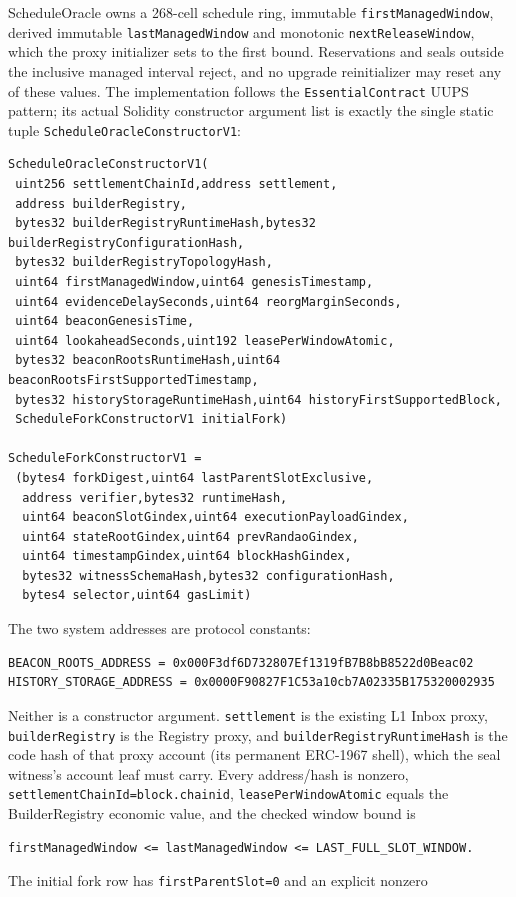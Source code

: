 \documentclass[a4paper,11pt]{article}
\newcommand{\code}[1]{\nolinkurl{#1}}
\begin{document}
ScheduleOracle owns a 268-cell schedule ring, immutable
\code{firstManagedWindow}, derived immutable \code{lastManagedWindow} and
monotonic \code{nextReleaseWindow}, which the proxy initializer sets to the
first bound.  Reservations and seals outside the inclusive managed interval
reject, and no upgrade reinitializer may reset any of these values.  The
implementation follows the \code{EssentialContract} UUPS pattern; its actual
Solidity constructor argument list is exactly the single static tuple
\code{ScheduleOracleConstructorV1}:
\begin{verbatim}
ScheduleOracleConstructorV1(
 uint256 settlementChainId,address settlement,
 address builderRegistry,
 bytes32 builderRegistryRuntimeHash,bytes32 builderRegistryConfigurationHash,
 bytes32 builderRegistryTopologyHash,
 uint64 firstManagedWindow,uint64 genesisTimestamp,
 uint64 evidenceDelaySeconds,uint64 reorgMarginSeconds,
 uint64 beaconGenesisTime,
 uint64 lookaheadSeconds,uint192 leasePerWindowAtomic,
 bytes32 beaconRootsRuntimeHash,uint64 beaconRootsFirstSupportedTimestamp,
 bytes32 historyStorageRuntimeHash,uint64 historyFirstSupportedBlock,
 ScheduleForkConstructorV1 initialFork)

ScheduleForkConstructorV1 =
 (bytes4 forkDigest,uint64 lastParentSlotExclusive,
  address verifier,bytes32 runtimeHash,
  uint64 beaconSlotGindex,uint64 executionPayloadGindex,
  uint64 stateRootGindex,uint64 prevRandaoGindex,
  uint64 timestampGindex,uint64 blockHashGindex,
  bytes32 witnessSchemaHash,bytes32 configurationHash,
  bytes4 selector,uint64 gasLimit)
\end{verbatim}
The two system addresses are protocol constants:
\begin{verbatim}
BEACON_ROOTS_ADDRESS = 0x000F3df6D732807Ef1319fB7B8bB8522d0Beac02
HISTORY_STORAGE_ADDRESS = 0x0000F90827F1C53a10cb7A02335B175320002935
\end{verbatim}
Neither is a constructor argument.  \code{settlement} is the existing L1
Inbox proxy, \code{builderRegistry} is the Registry proxy, and
\code{builderRegistryRuntimeHash} is the code hash of that proxy account (its
permanent ERC-1967 shell), which the seal witness's account leaf must carry.
Every address/hash is nonzero,
\code{settlementChainId=block.chainid},
\code{leasePerWindowAtomic} equals the BuilderRegistry economic value,
and the checked window bound is
\begin{verbatim}
firstManagedWindow <= lastManagedWindow <= LAST_FULL_SLOT_WINDOW.
\end{verbatim}
The
initial fork row has \code{firstParentSlot=0} and an explicit nonzero
\end{document}
